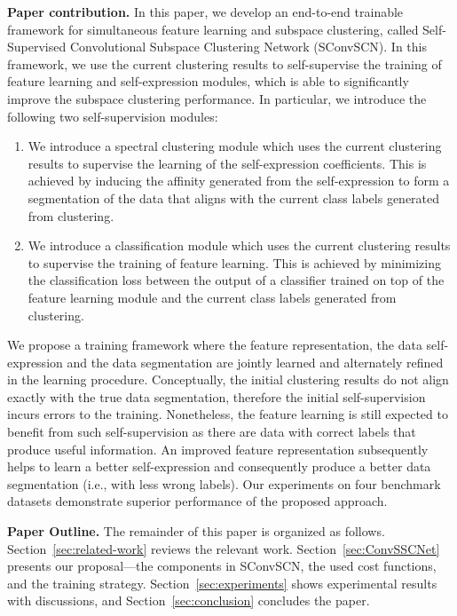 \documentclass[10pt,twocolumn,letterpaper]{article}
\def\ie{i.e.}
\newcommand{\myparagraph}[1]{\smallskip\noindent\textbf{#1.}}
\def\ie{i.e.}
\begin{document}
\myparagraph{Paper contribution}
In this paper, we develop an end-to-end trainable framework for simultaneous feature learning and subspace clustering, called Self-Supervised Convolutional Subspace Clustering Network (SConvSCN).
In this framework, we use the current clustering results to self-supervise the training of feature learning and self-expression modules, which is able to significantly improve the subspace clustering performance.
In particular, we introduce the following two self-supervision modules:
\begin{enumerate}
\item We introduce a spectral clustering module which uses the current clustering results to supervise the learning of the self-expression coefficients. This is achieved by inducing the affinity generated from the self-expression to form a segmentation of the data that aligns with the current class labels generated from clustering.
\item We introduce a classification module which uses the current clustering results to supervise the training of feature learning.
This is achieved by minimizing the classification loss between the output of a classifier trained on top of the feature learning module and the current class labels generated from clustering.
\end{enumerate}
We propose a training framework where the feature representation, the data self-expression and the data segmentation are jointly learned and alternately refined in the learning procedure.
Conceptually, the initial clustering results do not align exactly with the true data segmentation, therefore the initial self-supervision incurs errors to the training.
Nonetheless, the feature learning is still expected to benefit from such self-supervision as there are data with correct labels that produce useful information. An improved feature representation subsequently helps to learn a better self-expression and consequently produce a better data segmentation (\ie, with less wrong labels).
Our experiments on four benchmark datasets demonstrate superior performance of the proposed approach. 


\myparagraph{Paper Outline} The remainder of this paper is organized as follows. Section~\ref{sec:related-work} reviews the relevant work. Section~\ref{sec:ConvSSCNet} presents our proposal---the components in SConvSCN, the used cost functions, and the training strategy. Section~\ref{sec:experiments} shows experimental results with discussions, and Section~\ref{sec:conclusion} concludes the paper.
\end{document}
